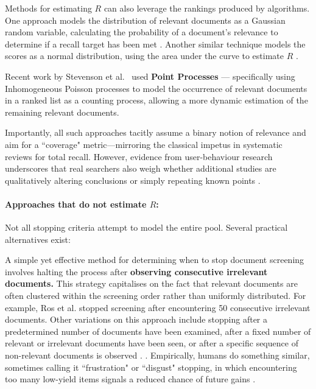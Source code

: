 \documentclass[10pt,oneside]{book}
\begin{document}
Methods for estimating $R$ can also leverage the rankings produced by algorithms.  One approach models the distribution of relevant documents as a Gaussian random variable, calculating the probability of a document's relevance to determine if a recall target has been met \cite{hollmann_ranking_2017}. Another similar technique models the scores as a normal distribution, using the area under the curve to estimate $R$ \cite{cormack_machine_2009}.

Recent work by Stevenson et al.~\cite{stevenson_stopping_2023} used \textbf{Point Processes} — specifically using Inhomogeneous Poisson processes to model the occurrence of relevant documents in a ranked list as a counting process, allowing a more dynamic estimation of the remaining relevant documents. 

Importantly, all such approaches tacitly assume a binary notion of relevance and aim for a ``coverage" metric—mirroring the classical impetus in systematic reviews for total recall. However, evidence from user-behaviour research underscores that real searchers also weigh whether additional studies are qualitatively altering conclusions or simply repeating known points \cite{ilani_analysis_2024, browne_stopping_2005}.

\paragraph{Approaches that do not estimate $R$: }  Not all stopping criteria attempt to model the entire pool. Several practical alternatives exist:

A simple yet effective method for determining when to stop document screening involves halting the process after \textbf{ observing consecutive irrelevant documents.}  This strategy capitalises on the fact that relevant documents are often clustered within the screening order rather than uniformly distributed.  For example, Ros et al.\cite{ros_machine_2017} stopped screening after encountering 50 consecutive irrelevant documents.  Other variations on this approach include stopping after a predetermined number of documents have been examined, after a fixed number of relevant or irrelevant documents have been seen, or after a specific sequence of non-relevant documents is observed \cite{losada_when_2019}. . Empirically, humans do something similar, sometimes calling it ``frustration" or ``disgust" stopping, in which encountering too many low-yield items signals a reduced chance of future gains \cite{cooper_selecting_1973, kraft_stopping_1979, ilani_analysis_2024}.
\end{document}
